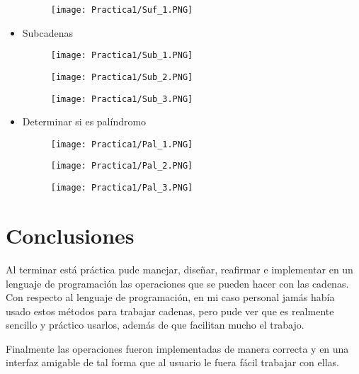 \documentclass[12pt]{article}
\begin{document}
\begin{itemize}
		\begin{figure}[H]
	        \centering
	        \texttt{[image: Practica1/Suf\_1.PNG]}
    	\end{figure}
    	
		\item Subcadenas

		\begin{figure}[H]
	        \centering
	        \texttt{[image: Practica1/Sub\_1.PNG]}
    	\end{figure}
		\begin{figure}[H]
	        \centering
	        \texttt{[image: Practica1/Sub\_2.PNG]}
    	\end{figure}
		\begin{figure}[H]
	        \centering
	        \texttt{[image: Practica1/Sub\_3.PNG]}
    	\end{figure}
\newpage
	    \item Determinar si es palíndromo

		\begin{figure}[H]
	        \centering
	        \texttt{[image: Practica1/Pal\_1.PNG]}
    	\end{figure}
		\begin{figure}[H]
	        \centering
	        \texttt{[image: Practica1/Pal\_2.PNG]}
    	\end{figure}
		\begin{figure}[H]
	        \centering
	        \texttt{[image: Practica1/Pal\_3.PNG]}
    	\end{figure}
	\end{itemize}
	\newpage
	\section{Conclusiones}

	Al terminar está práctica pude manejar, diseñar, reafirmar e implementar en un lenguaje de 
	programación las operaciones que se pueden hacer con las cadenas. Con respecto al lenguaje 
	de programación, en mi caso personal jamás había usado estos métodos para trabajar cadenas,
	pero pude ver que es realmente sencillo y práctico usarlos, además de que facilitan mucho el
	trabajo.

	Finalmente las operaciones fueron implementadas de manera correcta y en una interfaz amigable 
	de tal forma que al usuario le fuera fácil trabajar con ellas.

	 \nocite{ref1, ref2}
	
     
\end{document}
